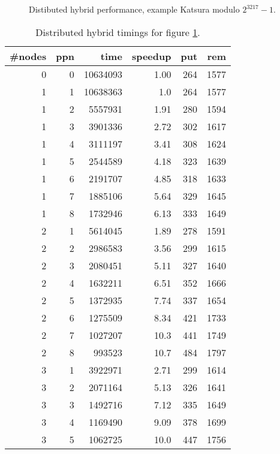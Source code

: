 \documentclass[10pt,twocolumn,a4paper]{article}
\begin{document}
\begin{figure}[thb]
\centering
{}
\caption{Distibuted hybrid performance, example Katsura modulo $2^{3217}-1$.}
\label{fig:k8m2hybrid}
\end{figure}

\begin{table}[thb]
\centering
\caption{Distributed hybrid timings for figure \ref{fig:k8m2hybrid}.}
\label{fig:kat8_distm2}
\small{
\clearpage{}
\begin{tabular}{|r|r|r|r|r|r|}
\hline
\#nodes & ppn & time & speedup & put & rem 
\\ \hline
 0 & 0 & 10634093 & 1.00 & 264 & 1577
\\ \hline
 1 & 1 & 10638363 & 1.0 & 264 & 1577
\\ \hline
 1 & 2 & 5557931  & 1.91 & 280 & 1594
\\ \hline
 1 & 3 & 3901336  & 2.72 & 302 & 1617
\\ \hline
 1 & 4 & 3111197  & 3.41 & 308 & 1624
\\ \hline
 1 & 5 & 2544589  & 4.18 & 323 & 1639
\\ \hline
 1 & 6 & 2191707  & 4.85 & 318 & 1633
\\ \hline
 1 & 7 & 1885106  & 5.64 & 329 & 1645
\\ \hline
 1 & 8 & 1732946  & 6.13 & 333 & 1649
\\ \hline
 2 & 1 & 5614045  & 1.89 & 278 & 1591
\\ \hline
 2 & 2 & 2986583  & 3.56 & 299 & 1615
\\ \hline
 2 & 3 & 2080451  & 5.11 & 327 & 1640
\\ \hline
 2 & 4 & 1632211  & 6.51 & 352 & 1666
\\ \hline
 2 & 5 & 1372935  & 7.74 & 337 & 1654
\\ \hline
 2 & 6 & 1275509  & 8.34 & 421 & 1733
\\ \hline
 2 & 7 & 1027207  & 10.3 & 441 & 1749
\\ \hline
 2 & 8 & 993523  & 10.7 & 484 & 1797
\\ \hline
 3 & 1 & 3922971 & 2.71 & 299 & 1614
\\ \hline
 3 & 2 & 2071164 & 5.13 & 326 & 1641
\\ \hline
 3 & 3 & 1492716 & 7.12 & 335 & 1649
\\ \hline
 3 & 4 & 1169490 & 9.09 & 378 & 1699
\\ \hline
 3 & 5 & 1062725 & 10.0 & 447 & 1756
\\ \hline

\end{tabular}}
\end{table}
\end{document}
